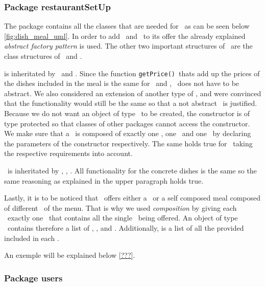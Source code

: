 
\subsubsection{Package restaurantSetUp} %
\label{ssub:restaurantsetup}

The package \restaurantSetup contains all the classes that are needed for \Restaurant~as can be seen below \ref{fig:dish_meal_uml}.
In order to add \Dish~and \Meal~to its offer the already explained \emph{abstract factory pattern} is used. The other two important structures of \restaurantSetup~are the class structures of \Meal~and \Dish. 

\Meal is inheritated by \HalfMeal~and \FullMeal. Since the function \lstinline|getPrice()|~thats add up the prices of the dishes included in the meal is the same for \FullMeal~and \HalfMeal, \Meal~does not have to be abstract. We also considered an extension of another type of \Meal, and were convinced that the functionality would still be the same so that a not abstract \Meal~is justified.
Because we do not want an object of type \Meal~to be created, the constructor is of type protected so that classes of other packages cannot access the constructor. We make sure that a \FullMeal~is composed of exactly one \Starter, one \MainDish~and one \Dessert~by declaring the parameters of the constructor respectively. The same holds true for \HalfMeal~taking the respective requirements into account.

\Dish~is inheritated by \Starter, \MainDish, \Dessert. All functionality for the concrete dishes is the same so the same reasoning as explained in the upper paragraph holds true. 

Lastly, it is to be noticed that \Restaurant~offers either a \Meal~or a self composed meal composed of different \Dish~of the menu. 
That is why we used \emph{composition} by giving each \Restaurant~exactly one \Menu~that contains all the single \Dish~being offered.
An object of type \Menu~contains therefore a list of \Starter, \MainDish, and \Dessert. Additionally, is a list of all the provided \Meal included in each \Restaurant.

An exemple will be explained below \ref{???}.


\subsubsection{Package users} %
\label{ssub:users}

